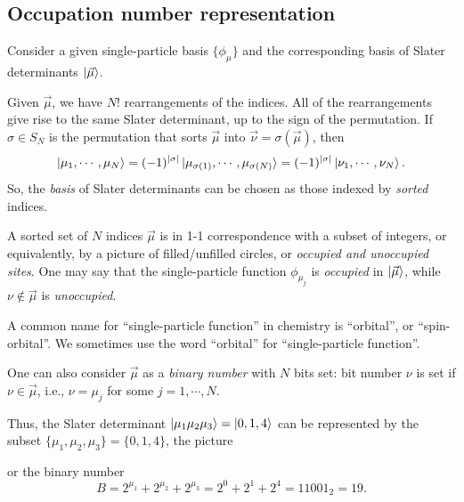 \documentclass{report}
\theoremstyle{plain}
\theoremstyle{definition}
\begin{document}
\subsection{Occupation number representation}

Consider a given single-particle basis $\{\phi_\mu\}$ and the
corresponding basis of Slater determinants $\ket{\vec{\mu}}$.

Given $\vec{\mu}$, we have $N!$ rearrangements of the indices. All of
the rearrangements give rise to the same Slater determinant, up to the
sign of the permutation. If $\sigma\in S_N$ is the permutation that
sorts $\vec{\mu}$ into $\vec{\nu} = \sigma(\vec{\mu})$, then
\begin{equation}
  \ket{\mu_1,\cdots,\mu_N} = (-1)^{|\sigma|}
  \ket{\mu_{\sigma(1)},\cdots,\mu_{\sigma(N)}} = (-1)^{|\sigma|}
  \ket{\nu_1,\cdots,\nu_N}.
\end{equation}
So, the \emph{basis} of Slater determinants can be chosen as those
indexed by \emph{sorted} indices.

A sorted set of $N$ indices $\vec{\mu}$ is in 1-1 correspondence with
a subset of integers, or
equivalently, by a picture of filled/unfilled circles, or
\emph{occupied and unoccupied sites}. One may say that the
single-particle function $\phi_{\mu_j}$ is \emph{occupied} in
$\ket{\vec{\mu}}$, while $\nu\notin\vec{\mu}$ is
\emph{unoccupied}.

A common name for ``single-particle function'' in chemistry is
``orbital'', or ``spin-orbital''. We sometimes use the word
``orbital'' for ``single-particle function''.

One can also consider $\vec{\mu}$ as a \emph{binary number} with $N$
bits set: bit number $\nu$ is set if $\nu \in \vec{\mu}$, i.e., $\nu
= \mu_j$ for some $j=1,\cdots,N$. 

Thus, the Slater determinant $\ket{\mu_1\mu_2\mu_3}=\ket{0,1,4}$ can be
represented by the subset $\{\mu_1,\mu_2,\mu_3\} = \{0,1,4\}$, the
picture 
\begin{center}
\end{center}

or the binary number
\begin{equation}
  B = 2^{\mu_1} + 2^{\mu_2} + 2^{\mu_3} = 2^0 + 2^1 + 2^4 =
  11001_2 = 19.
\end{equation}
\end{document}

